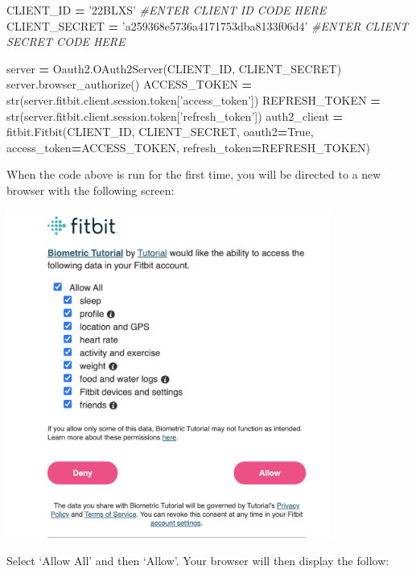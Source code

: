 \documentclass[]{book}
\newenvironment{Shaded}{\begin{snugshade}}{\end{snugshade}}
\newcommand{\StringTok}[1]{\textcolor[rgb]{0.31,0.60,0.02}{#1}}
\newcommand{\CommentTok}[1]{\textcolor[rgb]{0.56,0.35,0.01}{\textit{#1}}}
\newcommand{\VariableTok}[1]{\textcolor[rgb]{0.00,0.00,0.00}{#1}}
\newcommand{\OperatorTok}[1]{\textcolor[rgb]{0.81,0.36,0.00}{\textbf{#1}}}
\newcommand{\BuiltInTok}[1]{#1}
\newcommand{\NormalTok}[1]{#1}
\begin{document}
\begin{Shaded}
\begin{Highlighting}[]
\NormalTok{CLIENT_ID }\OperatorTok{=} \StringTok{'22BLXS'} \CommentTok{#ENTER CLIENT ID CODE HERE }
\NormalTok{CLIENT_SECRET }\OperatorTok{=} \StringTok{'a259368e5736a4171753dba8133f06d4'} \CommentTok{#ENTER CLIENT SECRET CODE HERE}

\NormalTok{server }\OperatorTok{=}\NormalTok{ Oauth2.OAuth2Server(CLIENT_ID, CLIENT_SECRET)}
\NormalTok{server.browser_authorize()}
\NormalTok{ACCESS_TOKEN }\OperatorTok{=} \BuiltInTok{str}\NormalTok{(server.fitbit.client.session.token[}\StringTok{'access_token'}\NormalTok{])}
\NormalTok{REFRESH_TOKEN }\OperatorTok{=} \BuiltInTok{str}\NormalTok{(server.fitbit.client.session.token[}\StringTok{'refresh_token'}\NormalTok{])}
\NormalTok{auth2_client }\OperatorTok{=}\NormalTok{ fitbit.Fitbit(CLIENT_ID, CLIENT_SECRET, oauth2}\OperatorTok{=}\VariableTok{True}\NormalTok{, access_token}\OperatorTok{=}\NormalTok{ACCESS_TOKEN,}
\NormalTok{refresh_token}\OperatorTok{=}\NormalTok{REFRESH_TOKEN)}
\end{Highlighting}
\end{Shaded}

When the code above is run for the first time, you will be directed to a
new browser with the following screen:

\includegraphics[width=0.80000\textwidth]{images/accessData.png}

Select `Allow All' and then `Allow'. Your browser will then display the
follow:
\end{document}
